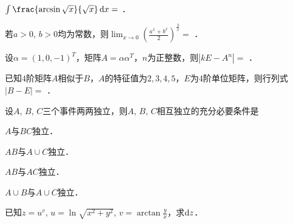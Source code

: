 \documentclass[plain,noanswer,medmath]{../../template/jnuexam}
\begin{document}






\begin{problem}
$\int \frac{\arcsin \sqrt{x}}{\sqrt{x}} \dx =$ \fillin{}．
\end{problem}


\begin{problem}
若$a > 0$, $b > 0$均为常数，则$\lim_{x \to 0} \left(\frac{a^x + b^x}{2} \right)^{\frac{3}{x}} =$ \fillin{}．
\end{problem}


\begin{problem}
设$\alpha = (1,0, - 1)^T$，矩阵$A = \alpha \alpha^T$，$n$为正整数，则$|kE - A^n| =$ \fillin{}．
\end{problem}


\begin{problem}
已知$4$阶矩阵$A$相似于$B$，$A$的特征值为$2,3,4,5$，$E$为$4$阶单位矩阵，则行列式$|B - E| =$ \fillin{}．
\end{problem}












\begin{problem}
设$A$, $B$, $C$三个事件两两独立，则$A$, $B$, $C$相互独立的充分必要条件是\pickout{}
\begin{abcd}
\item $A$与$BC$独立．
\item $AB$与$A \cup C$独立．
\item $AB$与$AC$独立．
\item $A \cup B$与$A \cup C$独立．
\end{abcd}
\end{problem}





\begin{problem}
已知$z = u^v$, $u = \ln \sqrt{x^2 + y^2}$, $v = \arctan \frac{y}{x}$，求$\mathop{}\!\mathrm{d} z$．
\end{problem}
\end{document}
